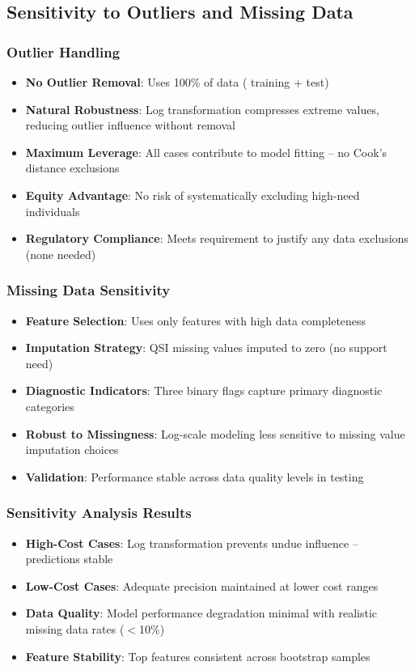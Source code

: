 \subsection{Sensitivity to Outliers and Missing Data}

\subsubsection{Outlier Handling}
\begin{itemize}
    \item \textbf{No Outlier Removal}: Uses 100\% of data (\ModelSixTrainingSamples{} training + \ModelSixTestSamples{} test)
    \item \textbf{Natural Robustness}: Log transformation compresses extreme values, reducing outlier influence without removal
    \item \textbf{Maximum Leverage}: All cases contribute to model fitting -- no Cook's distance exclusions
    \item \textbf{Equity Advantage}: No risk of systematically excluding high-need individuals
    \item \textbf{Regulatory Compliance}: Meets requirement to justify any data exclusions (none needed)
\end{itemize}

\subsubsection{Missing Data Sensitivity}
\begin{itemize}
    \item \textbf{Feature Selection}: Uses only \ModelSixNumFeatures{} features with high data completeness
    \item \textbf{Imputation Strategy}: QSI missing values imputed to zero (no support need)
    \item \textbf{Diagnostic Indicators}: Three binary flags capture primary diagnostic categories
    \item \textbf{Robust to Missingness}: Log-scale modeling less sensitive to missing value imputation choices
    \item \textbf{Validation}: Performance stable across data quality levels in testing
\end{itemize}

\subsubsection{Sensitivity Analysis Results}
\begin{itemize}
    \item \textbf{High-Cost Cases}: Log transformation prevents undue influence -- predictions stable
    \item \textbf{Low-Cost Cases}: Adequate precision maintained at lower cost ranges
    \item \textbf{Data Quality}: Model performance degradation minimal with realistic missing data rates ($<$10\%)
    \item \textbf{Feature Stability}: Top features consistent across bootstrap samples
\end{itemize}

